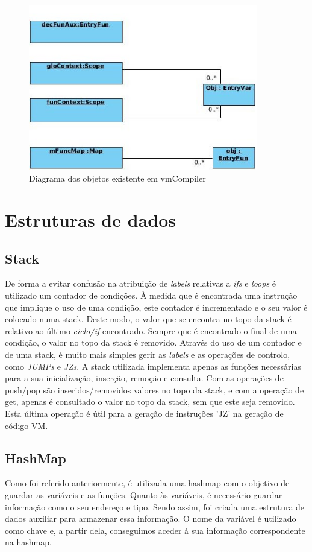 \documentclass[a4paper,10pt]{report}
\begin{document}
\begin{figure}
\centering
\includegraphics[width=10cm]{imagens/objetos.jpg}
\caption{Diagrama dos objetos existente em vmCompiler}
\label{fig:objs}
\end{figure}



\section{Estruturas de dados}

\subsection{Stack}
      De forma a evitar confusão na atribuição de \emph{labels} relativas a \emph{ifs} e \emph{loops} é utilizado um contador de condições. À medida que é encontrada uma instrução que implique o uso de uma condição, este contador é incrementado e o seu valor é colocado numa stack. Deste modo, o valor que se encontra no topo da stack é relativo ao último \emph{ciclo/if} encontrado. Sempre que é encontrado o final de uma condição, o valor no topo da stack é removido. Através do uso de um contador e de uma stack, é muito mais simples gerir as \emph{labels} e as operações de controlo, como \emph{JUMPs} e \emph{JZs}.
      A stack utilizada implementa apenas as funções necessárias para a sua inicialização, inserção, remoção e consulta. Com as operações de push/pop são inseridos/removidos valores no topo da stack, e com a operação de get, apenas é consultado o valor no topo da stack, sem que este seja removido. Esta última operação é útil para a geração de instruções 'JZ' na geração de código VM.

\subsection{HashMap}
	Como foi referido anteriormente, é utilizada uma hashmap com o objetivo de guardar as variáveis e as funções. Quanto às variáveis, é necessário guardar informação como o seu endereço e tipo. Sendo assim, foi criada uma estrutura de dados auxiliar para armazenar essa informação. O nome da variável é utilizado como chave e, a partir dela, conseguimos aceder à sua informação correspondente na hashmap. 
\end{document}
